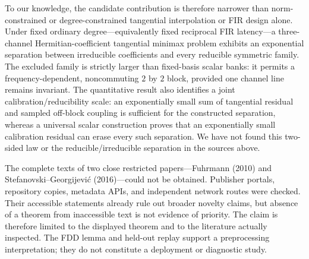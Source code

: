 \documentclass[11pt]{article}
\theoremstyle{remark}
\begin{document}
To our knowledge, the candidate contribution is therefore narrower than
norm-constrained or degree-constrained tangential interpolation or FIR design alone.  Under fixed
ordinary degree---equivalently fixed reciprocal FIR latency---a three-channel
Hermitian-coefficient tangential minimax problem exhibits an exponential
separation between irreducible coefficients and every reducible symmetric
family.  The excluded family is strictly larger than fixed-basis scalar banks:
it permits a frequency-dependent, noncommuting $2$ by $2$ block, provided one
channel line remains invariant.  The quantitative result also identifies a
joint calibration/reducibility scale: an exponentially small sum of tangential
residual and sampled off-block coupling is sufficient for the constructed
separation, whereas a universal scalar construction proves that an
exponentially small calibration residual can erase every such separation.  We
have not found this two-sided law or the reducible/irreducible separation in
the sources above.

The complete texts of two close restricted papers---Fuhrmann (2010) and
Stefanovski--Georgijevi\'c (2016)---could not be obtained.  Publisher portals,
repository copies, metadata APIs, and independent network routes were checked.
Their accessible statements already rule out broader novelty claims, but
absence of a theorem from inaccessible text is not evidence of priority.  The
claim is therefore limited to the displayed theorem and to the literature
actually inspected.
The FDD lemma and held-out replay support a preprocessing interpretation; they
do not constitute a deployment or diagnostic study.
\end{document}
